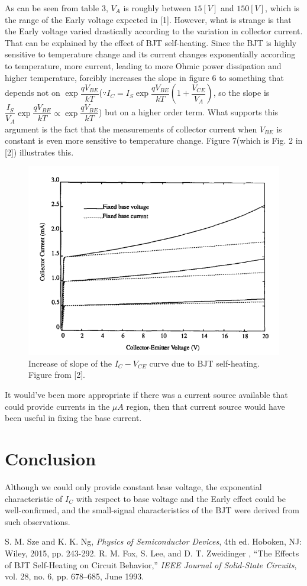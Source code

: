 \documentclass[a4paper, itemph]{oblivoir}
\theoremstyle{definition}
\begin{document}
As can be seen from table 3, $V_A$ is roughly between $15[V]$ and $150[V]$, which is the range of the Early voltage expected in [1]. However, what is strange is that the Early voltage varied drastically according to the variation in collector current. That can be explained by the effect of BJT self-heating. Since the BJT is highly sensitive to temperature change and its current changes exponentially according to temperature, more current, leading to more Ohmic power dissipation and higher temperature, forcibly increases the slope in figure 6 to something that depends not on $\exp{\dfrac{qV_{BE}}{kT}}$($\because I_C=I_S\exp{\dfrac{qV_{BE}}{kT}}(1+\dfrac{V_{CE}}{V_A})$, so the slope is $\dfrac{I_S}{V_A}\exp{\dfrac{qV_{BE}}{kT}}\propto \exp{\dfrac{qV_{BE}}{kT}}$) but on a higher order term. What supports this argument is the fact that the measurements of collector current when $V_{BE}$ is constant is even more sensitive to temperature change. Figure 7(which is Fig. 2 in [2]) illustrates this.
\begin{figure}[htb]
    \centering
    \includegraphics[width=0.5\linewidth]{self heating.PNG}
    \caption{Increase of slope of the $I_C-V_{CE}$ curve due to BJT self-heating. Figure from [2].}
\end{figure}

It would've been more appropriate if there was a current source available that could provide currents in the $\mu A$ region, then that current source would have been useful in fixing the base current.
\section{Conclusion}
Although we could only provide constant base voltage, the exponential characteristic of $I_C$ with respect to base voltage and the Early effect could be well-confirmed, and the small-signal characteristics of the BJT were derived from such observations.
\begin{thebibliography}{}

 S. M. Sze and K. K. Ng, \textit{Physics of Semiconductor Devices}, 4th ed. Hoboken, NJ: Wiley, 2015, pp. 243-292.
 R. M. Fox, S. Lee, and D. T. Zweidinger , “The Effects of BJT Self-Heating on Circuit Behavior,” \textit{IEEE Journal of Solid-State Circuits}, vol. 28, no. 6, pp. 678–685, June 1993.

\end{thebibliography}
\end{document}
